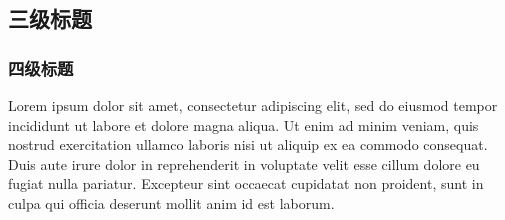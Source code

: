\subsection{三级标题}

\subsubsection{四级标题}

Lorem ipsum dolor sit amet, consectetur adipiscing elit, sed do eiusmod tempor
incididunt ut labore et dolore magna aliqua. Ut enim ad minim veniam, quis
nostrud exercitation ullamco laboris nisi ut aliquip ex ea commodo consequat.
Duis aute irure dolor in reprehenderit in voluptate velit esse cillum dolore eu
fugiat nulla pariatur. Excepteur sint occaecat cupidatat non proident, sunt in
culpa qui officia deserunt mollit anim id est laborum.
